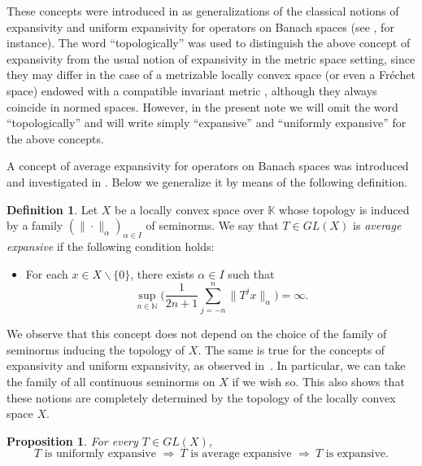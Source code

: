\documentclass[12pt]{amsart}
\theoremstyle{theorem}
\newtheorem{proposition}[theorem]{Proposition}
\theoremstyle{definition}
\newtheorem{definition}[theorem]{Definition}
\theoremstyle{remark} \theoremstyle{question} \theoremstyle{example}
\newcommand{\N}{\mathbb{N}}   %
\newcommand{\K}{\mathbb{K}}   %
\begin{document}
These concepts were introduced in \cite{BCDFP} as generalizations of the classical notions of expansivity and uniform expansivity for operators on Banach spaces (see \cite{MEisJHed70}, for instance).
The word ``topologically'' was used to distinguish the above concept of expansivity from the usual notion of expansivity in the metric space setting, since they may differ in the case of a metrizable locally convex space (or even a Fr\'echet space) endowed with a compatible invariant metric \cite[Example~31]{BCDFP}, although they always coincide in normed spaces.
However, in the present note we will omit the word ``topologically'' and will write simply ``expansive'' and ``uniformly expansive''
for the above concepts.

A concept of average expansivity for operators on Banach spaces was introduced and investigated in \cite{AlvBerMes21}.
Below we generalize it by means of the following definition.

\begin{definition}\label{AE-D1}
Let $X$ be a locally convex space over $\K$ whose topology is induced by a family $(\|\cdot\|_\alpha)_{\alpha \in I}$ of seminorms.
We say that $T \in GL(X)$ is {\em average expansive} if the following condition holds:
\begin{itemize}
\item [(AE)] For each $x \in X \backslash \{0\}$, there exists $\alpha \in I$ such that
\[
\sup_{n \in \N} \Big(\frac{1}{2n+1} \sum_{j=-n}^n \|T^j x\|_\alpha \Big) = \infty.
\]
\end{itemize}
\end{definition}

We observe that this concept does not depend on the choice of the family of seminorms inducing the topology of $X$. 
The same is true for the concepts of expansivity and uniform expansivity, as observed in~\cite{BCDFP}.
In particular, we can take the family of all continuous seminorms on $X$ if we wish so.
This also shows that these notions are completely determined by the topology of the locally convex space $X$.

\begin{proposition}\label{AE-P1}
For every $T \in GL(X)$,
\[
T \text{ is uniformly expansive } \Longrightarrow \ T \text{ is average expansive } \Longrightarrow \ T \text{ is expansive}.
\]
\end{proposition}
\end{document}
